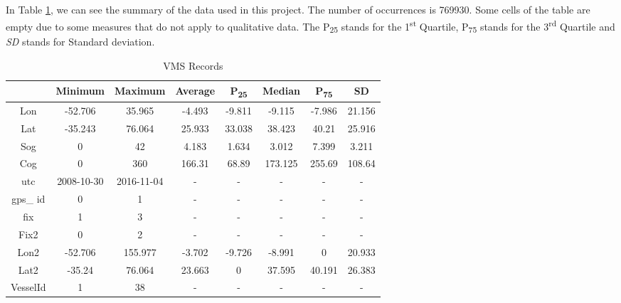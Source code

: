 In Table \ref{table:vms_records}, we can see the summary of the data used in this project. The number of occurrences is 769930. 
Some cells of the table are empty due to some measures that do not apply to qualitative data.
The P\textsubscript{25} stands for the 1\textsuperscript{st} Quartile, P\textsubscript{75} stands for the 3\textsuperscript{rd} Quartile and \textit{SD} stands for Standard deviation.

\begin {table}[h]
\small
\begin{center}
\begin{tabular}{c|c|c|c|c|c|c|c}
& Minimum & Maximum & Average & P\textsubscript{25} & Median & P\textsubscript{75} & SD\\
\hline
Lon & -52.706 & 35.965 & -4.493 &-9.811&-9.115&-7.986&21.156\\
Lat & -35.243 &76.064&25.933&33.038&38.423&40.21&25.916\\
Sog & 0 &42&4.183&1.634&3.012&7.399&3.211\\
Cog & 0&360&166.31&68.89&173.125&255.69&108.64\\
utc & 2008-10-30 & 2016-11-04 &-&-&-&-&-\\
gps\_ id & 0&1&-&-&-&-&-\\
fix & 1&3&-&-&-&-&-\\
Fix2 & 0&2&-&-&-&-&-\\
Lon2 & -52.706&155.977&-3.702&-9.726&-8.991&0&20.933\\
Lat2 & -35.24&76.064&23.663&0&37.595&40.191&26.383\\
VesselId & 1&38&-&-&-&-&-
\label{table:vms_records}
\end{tabular}
\caption {VMS Records}
\end{center}
\end {table}


\newpage 


